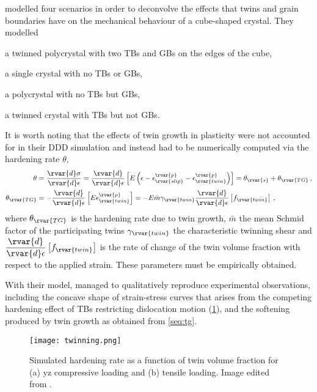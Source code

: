  modelled four scenarios in order to deconvolve the effects that twins and grain boundaries have on the mechanical behaviour of a cube-shaped crystal. They modelled
\begin{inparaenum}[\itshape 1\upshape)]
    \item a twinned polycrystal with two TBs and GBs on the edges of the cube,
    \item a single crystal with no TBs or GBs,
    \item a polycrystal with no TBs but GBs,
    \item a twinned crystal with TBs but not GBs.
\end{inparaenum}
It is worth noting that the effects of twin growth in plasticity were not accounted for in their DDD simulation and instead had to be numerically computed via the hardening rate $ \theta $,
\begin{subequations}
    \begin{align}
        \theta             & = \dfrac{\rvar{d}\sigma}{\rvar{d}\epsilon} = \dfrac{\rvar{d}}{\rvar{d}\epsilon}  \left[E\left(\epsilon - \epsilon_{\rvar{slip}}^{\rvar{p}} - \epsilon_{\rvar{twin}}^{\rvar{p}}\right)\right] = \theta_{\rvar{s}} + \theta_{\rvar{TG}}\,, \\
        \theta_{\rvar{TG}} & = -\dfrac{\rvar{d}}{\rvar{d}\epsilon} \left[E \epsilon_{\rvar{twin}}^{\rvar{p}} \right] = -E \bar{m} \gamma_{\rvar{twin}} \dfrac{\rvar{d}}{\rvar{d} \epsilon} \left[f_{\rvar{twin}}\right]\label{seq:tg}\,,
    \end{align}
\end{subequations}
where $ \theta_{\rvar{TG}} $ is the hardening rate due to twin growth, $ \bar{m} $ the mean Schmid factor of the participating twins $ \gamma_{\rvar{twin}} $ the characteristic twinning shear and $ \dfrac{\rvar{d}}{\rvar{d} \epsilon} \left[f_{\rvar{twin}}\right] $ is the rate of change of the twin volume fraction with respect to the applied strain. These parameters must be empirically obtained.

With their model, \citet{twinning} managed to qualitatively reproduce experimental observations, including the concave shape of strain-stress curves that arises from the competing hardening effect of TBs restricting dislocation motion (\cref{f:twinning}), and the softening produced by twin growth as obtained from \cref{seq:tg}.
\begin{figure}[t]
    \centering
    \texttt{[image: twinning.png]}
    \caption[Modelling twinned multicrystals with DDD.]{Simulated hardening rate as a function of twin volume fraction for (a) yz compressive loading and (b) tensile loading. Image edited from \cite{twinning}.}
    \label{f:twinning}
\end{figure}

